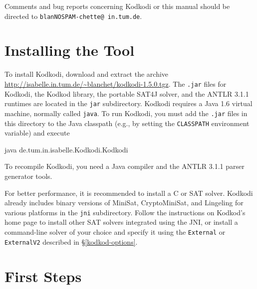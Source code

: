 \documentclass[a4paper,12pt]{article}
\begin{document}
Comments and bug reports concerning Kodkodi or this manual should be directed to
\texttt{blan{\color{white}NOSPAM}\kern-\wd\boxA{}chette@\allowbreak
in.\allowbreak tum.\allowbreak de}.

%

\section{Installing the Tool}
\label{installing-the-tool}

To install Kodkodi, download and extract the archive
\url{http://isabelle.in.tum.de/~blanchet/kodkodi-1.5.0.tgz}. The \texttt{.jar}
files for Kodkodi, the Kodkod library, the portable SAT4J solver, and the ANTLR
3.1.1 runtimes are located in the \texttt{jar} subdirectory. Kodkodi
requires a Java 1.6 virtual machine, normally called \texttt{java}. To run
Kodkodi, you must add the \texttt{.jar} files in this directory to the Java
classpath (e.g., by setting the \texttt{CLASSPATH} environment variable) and
execute

\pre
\ttfamily\small java de.tum.in.isabelle.Kodkodi.Kodkodi
\post

To recompile Kodkodi, you need a Java compiler and the ANTLR 3.1.1 parser
generator tools.

For better performance, it is recommended to install a C or \cpp{} SAT solver.
Kodkodi already includes binary versions of MiniSat, CryptoMiniSat, and
Lingeling for various platforms in the \texttt{jni} subdirectory. Follow the
instructions on Kodkod's home page \cite{kodkod-2009} to install other SAT
solvers integrated using the JNI, or install a command-line solver of your
choice and specify it using the \texttt{External} or \texttt{ExternalV2}
described in \S\ref{kodkod-options}.

\section{First Steps}
\label{first-steps}
\end{document}
